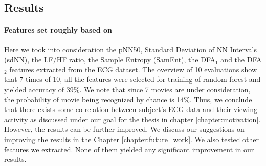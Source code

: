 \subsection{Results}
\label{sec:ecg_analysis_results}
\paragraph{Features set roughly based on \citeauthor{zhao_emotion_2016}} Here we took into consideration the pNN50, Standard Deviation of NN Intervals (sdNN), the LF/HF ratio, the Sample Entropy (SamEnt), the DFA$_{1}$ and the DFA$_{2}$ features extracted from the ECG dataset. The overview of 10 evaluations show that 7 times of 10, all the features were selected for training of random forest and yielded accuracy of 39\%. We note that since 7 movies are under consideration, the probability of movie being recognized by chance is 14\%. Thus, we conclude that there exists some co-relation between subject's ECG data and their viewing activity as discussed under our goal for the thesis in chapter \ref{chapter:motivation}. However, the results can be further improved. We discuss our suggestions on improving the results in the Chapter \ref{chapter:future_work}. We also tested other features we extracted. None of them yielded any significant improvement in our results.

